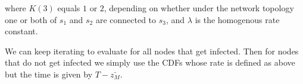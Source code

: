 \documentclass{article}
\begin{document}
	where $K(3)$ equals $1$ or $2$, depending on whether under the network
	topology one or both of $s_1$ and $s_2$ are connected to $s_3$, and
	$\lambda$ is the homogenous rate constant.

	We can keep iterating to evaluate for all nodes that get infected. Then for nodes that do 
        not get infected we simply use the CDFs whose rate is defined as above but the time
        is given by $T- \bar{z_M}$.



	




\end{document}

